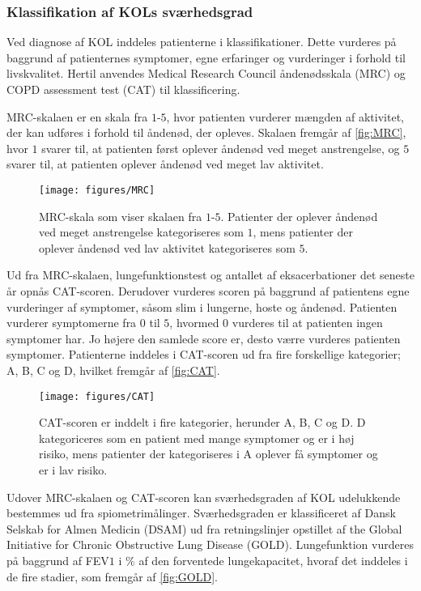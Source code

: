 \subsubsection{Klassifikation af KOLs sværhedsgrad}
Ved diagnose af KOL inddeles patienterne i klassifikationer. Dette vurderes på baggrund af patienternes symptomer, egne erfaringer og vurderinger i forhold til livskvalitet. Hertil anvendes Medical Research Council åndenødsskala (MRC) og COPD assessment test (CAT) til klassificering.\cite{Basisbogen2016}
 
MRC-skalaen er en skala fra $1$-$5$, hvor patienten vurderer mængden af aktivitet, der kan udføres i forhold til åndenød, der opleves. Skalaen fremgår af \autoref{fig:MRC}, hvor $1$ svarer til, at patienten først oplever åndenød ved meget anstrengelse, og $5$ svarer til, at patienten oplever åndenød ved meget lav aktivitet. \cite{Basisbogen2016}

\begin{figure} [H]
\centering
\texttt{[image: figures/MRC]}
\caption{MRC-skala som viser skalaen fra $1$-$5$. Patienter der oplever åndenød ved meget anstrengelse kategoriseres som $1$, mens patienter der oplever åndenød ved lav aktivitet kategoriseres som $5$.}
\label{fig:MRC}
\end{figure} 

\noindent
Ud fra MRC-skalaen, lungefunktionstest og antallet af eksacerbationer det seneste år opnås CAT-scoren. Derudover vurderes scoren på baggrund af patientens egne vurderinger af symptomer, såsom slim i lungerne, hoste og åndenød. Patienten vurderer symptomerne fra $0$ til $5$, hvormed $0$ vurderes til at patienten ingen symptomer har. Jo højere den samlede score er, desto værre vurderes patienten symptomer. \cite{Basisbogen2016, dsam2016} Patienterne inddeles i CAT-scoren ud fra fire forskellige kategorier; A, B, C og D, hvilket fremgår af \autoref{fig:CAT}.

\begin{figure} [H]
\centering
\texttt{[image: figures/CAT]}
\caption{CAT-scoren er inddelt i fire kategorier, herunder A, B, C og D. D kategoriceres som en patient med mange symptomer og er i høj risiko, mens patienter der kategoriseres i A oplever få symptomer og er i lav risiko.}
\label{fig:CAT}
\end{figure} 
 
\noindent
Udover MRC-skalaen og CAT-scoren kan sværhedsgraden af KOL udelukkende bestemmes ud fra spiometrimålinger. Sværhedsgraden er klassificeret af Dansk Selskab for Almen Medicin (DSAM) ud fra retningslinjer opstillet af the Global Initiative for Chronic Obstructive Lung Disease (GOLD). Lungefunktion vurderes på baggrund af FEV$1$ i \% af den forventede lungekapacitet, hvoraf det inddeles i de fire stadier, som fremgår af \autoref{fig:GOLD}.

